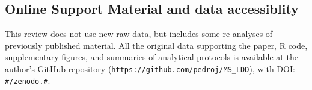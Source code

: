 \documentclass[a4paper, 12pt]{article}
\begin{document}
\begin{linenumbers}
\newpage 

\section*{Online Support Material and data accessiblity}

This review does not use new raw data, but includes some re-analyses of previously published material. All the original data supporting the paper, R code, supplementary figures, and summaries of analytical protocols is available at the author's GitHub repository (\texttt{https://github.com/pedroj/MS\_LDD}), with DOI: \texttt{\#/zenodo.\#}.

\end{linenumbers}
\end{document}
